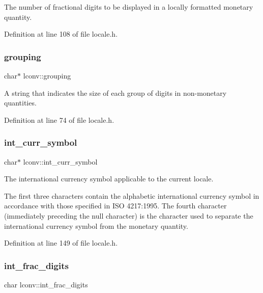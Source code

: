 The number of fractional digits to be displayed in a locally formatted monetary quantity. 



Definition at line 108 of file locale.\+h.

\mbox{\label{structlconv_a46e468755a823be50de20f36be5ff2be}} 
\subsubsection{\texorpdfstring{grouping}{grouping}}
{\footnotesize\ttfamily char$\ast$ lconv\+::grouping}



A string that indicates the size of each group of digits in non-\/monetary quantities. 



Definition at line 74 of file locale.\+h.

\mbox{\label{structlconv_abaeeafb02b68ba58c549458b196b9325}} 
\subsubsection{\texorpdfstring{int\_curr\_symbol}{int\_curr\_symbol}}
{\footnotesize\ttfamily char$\ast$ lconv\+::int\+\_\+curr\+\_\+symbol}



The international currency symbol applicable to the current locale. 

The first three characters contain the alphabetic international currency symbol in accordance with those specified in I\+SO 4217\+:1995. The fourth character (immediately preceding the null character) is the character used to separate the international currency symbol from the monetary quantity. 

Definition at line 149 of file locale.\+h.

\mbox{\label{structlconv_a6b652f28cafc3092258b47c8099fe905}} 
\subsubsection{\texorpdfstring{int\_frac\_digits}{int\_frac\_digits}}
{\footnotesize\ttfamily char lconv\+::int\+\_\+frac\+\_\+digits}



